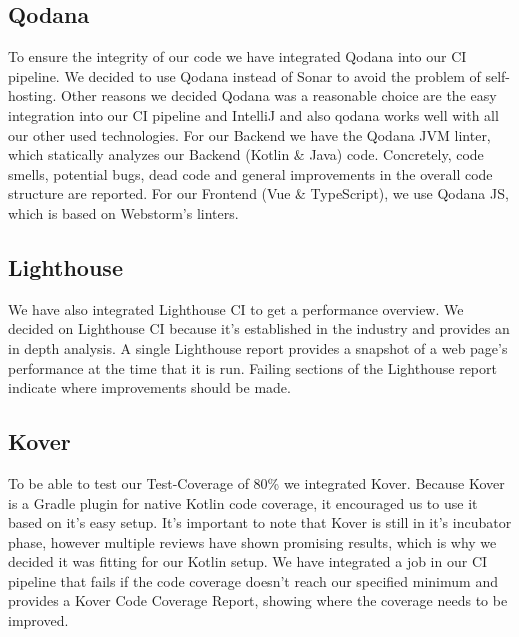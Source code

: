 \subsection{Qodana}
To ensure the integrity of our code we have integrated Qodana into our CI pipeline.
We decided to use Qodana instead of Sonar to avoid the problem of self-hosting.
Other reasons we decided Qodana was a reasonable choice are the easy integration into our CI pipeline and IntelliJ and also qodana works well with all our other used technologies. 
For our Backend we have the Qodana JVM linter, which statically analyzes our Backend (Kotlin \& Java) code.
Concretely, code smells, potential bugs, dead code and general improvements in the overall code structure are reported.
For our Frontend (Vue \& TypeScript), we use Qodana JS, which is based on Webstorm's linters.

\subsection{Lighthouse}
We have also integrated Lighthouse CI to get a performance overview.
We decided on Lighthouse CI because it's established in the industry and provides an in depth analysis.
A single Lighthouse report provides a snapshot of a web page's performance at the time that it is run.
Failing sections of the Lighthouse report indicate where improvements should be made. 

\subsection{Kover}
To be able to test our Test-Coverage of 80\% we integrated Kover.
Because Kover is a Gradle plugin for native Kotlin code coverage, it encouraged us to use it based on it's easy setup.
It's important to note that Kover is still in it's incubator phase, however multiple reviews have shown promising results, which is why we decided it was fitting for our Kotlin setup. 
We have integrated a job in our CI pipeline that fails if the code coverage doesn't reach our specified minimum and provides a Kover Code Coverage Report, showing where the coverage needs to be improved. 
